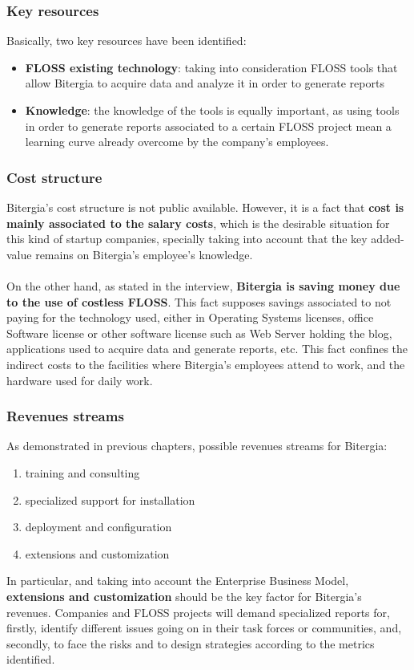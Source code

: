 \documentclass[11pt]{article}
\begin{document}
\subsubsection{Key resources}
Basically, two key resources have been identified:
\begin{itemize}
\item{\textbf{FLOSS existing technology}: taking into consideration FLOSS tools that allow Bitergia to acquire data and analyze it in order to generate reports}
\item{\textbf{Knowledge}: the knowledge of the tools is equally important, as using tools in order to generate reports associated to a certain FLOSS project mean a learning curve already overcome by the company's employees.}
\end{itemize}

\subsubsection{Cost structure}
Bitergia's cost structure is not public available. However, it is a fact that \textbf{cost is mainly associated to the salary costs}, which is the desirable situation for this kind of startup companies, specially taking into account that the key added-value remains on Bitergia's employee's knowledge.\\
\\
On the other hand, as stated in the interview, \textbf{Bitergia is saving money due to the use of costless FLOSS}. This fact supposes savings associated to not paying for the technology used, either in Operating Systems licenses, office Software license or other software license such as Web Server holding the blog, applications used to acquire data and generate reports, etc. This fact confines the indirect costs to the facilities where Bitergia's employees attend to work, and the hardware used for daily work.

\subsubsection{Revenues streams}
As demonstrated in previous chapters, possible revenues streams for Bitergia:
\begin{enumerate}\itemsep0.2pt
\item {training and consulting}
\item {specialized support for
installation}
\item {deployment and configuration}
\item {extensions and customization}
\end{enumerate}
In particular, and taking into account the Enterprise Business Model, \textbf{extensions and customization} should be the key factor for Bitergia's revenues. Companies and FLOSS projects will demand specialized reports for, firstly, identify different issues going on in their task forces or communities, and, secondly, to face the risks and to design strategies according to the metrics identified.
\end{document}
